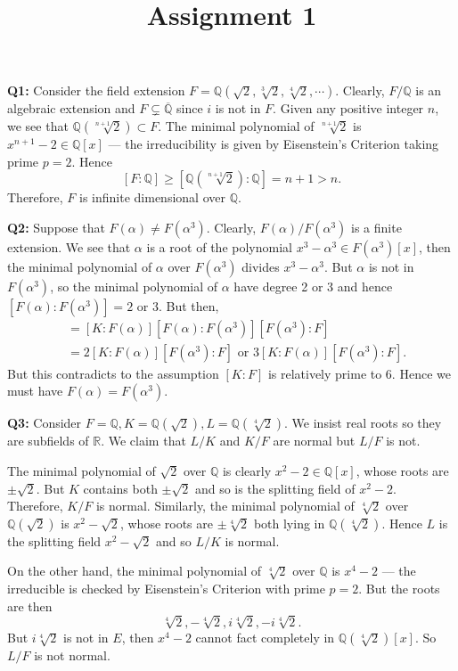 \documentclass[12pt,a4paper]{article}
\title{Assignment 1}
\author{}
\date{}
\def\QQ{\mathbb{Q}}
\def\RR{\mathbb{R}}
\def\aa{\alpha}
\begin{document}
\maketitle

\noindent\textbf{Q1:}
Consider the field extension $F=\QQ(\sqrt{2},\sqrt[3]{2},\sqrt[4]{2},\cdots)$. Clearly, $F/\QQ$ is an algebraic extension and $F\subsetneq \overline{\QQ}$ since $i$ is not in $F$. Given any positive integer $n$, we see that $\QQ(\sqrt[n+1]{2})\subset F$. The minimal polynomial of $\sqrt[n+1]{2}$ is $x^{n+1}-2\in \QQ[x]$ --- the irreducibility is given by Eisenstein's Criterion taking prime $p=2$. Hence $$[F:\QQ] \geq [\QQ(\sqrt[n+1]{2}): \QQ] = n+1 >n.$$
Therefore, $F$ is infinite dimensional over $\QQ$.

\bigskip

\noindent\textbf{Q2:}
Suppose that $F(\aa)\not= F(\aa^3)$. Clearly, $F(\aa)/F(\aa^3)$ is a finite extension. We see that  $\aa$ is a root of the polynomial $x^3-\aa^3\in F(\aa^3)[x]$, then the minimal polynomial of $\aa$ over $F(\aa^3)$ divides $x^3-\aa^3$. But $\aa$ is not in $F(\aa^3)$, so the minimal polynomial of $\aa$ have degree 2 or 3 and hence $[F(\aa):F(\aa^3)]=2$ or 3. But then, 
\begin{align*}
    [K:F]& =[K:F(\aa)][F(\aa):F(\aa^3)][F(\aa^3):F] \\
    & =2[K:F(\aa)][F(\aa^3):F]  \mbox{ or } 3[K:F(\aa)][F(\aa^3):F].
\end{align*}
But this contradicts to the assumption $[K:F]$ is relatively prime to 6. Hence we must have $F(\aa)=F(\aa^3)$.

\bigskip

\noindent\textbf{Q3:} 
Consider $F=\QQ, K=\QQ(\sqrt{2}), L=\QQ(\sqrt[4]{2})$. We insist real roots so they are subfields of $\RR$. We claim that $L/K$ and $K/F$ are normal but $L/F$ is not. 

The minimal polynomial of $\sqrt{2}$ over $\QQ$ is clearly $x^2-2\in \QQ[x]$, whose roots are $\pm \sqrt{2}$. But $K$ contains both $\pm\sqrt{2}$ and so is the splitting field of $x^2-2$. Therefore, $K/F$ is normal. Similarly, the minimal polynomial of $\sqrt[4]{2}$ over $\QQ(\sqrt{2})$ is $x^2-\sqrt{2}$, whose roots are $\pm\sqrt[4]{2}$ both lying in $\QQ(\sqrt[4]{2})$. Hence $L$ is the splitting field $x^2-\sqrt{2}$ and so $L/K$ is normal.

On the other hand, the minimal polynomial of $\sqrt[4]{2}$ over $\QQ$ is $x^4-2$ --- the irreducible is checked by Eisenstein's Criterion with prime $p=2$. But the roots are then $$\sqrt[4]{2},-\sqrt[4]{2},i\sqrt[4]{2},-i\sqrt[4]{2}.$$ But $i\sqrt[4]{2}$ is not in $E$, then $x^4-2$ cannot fact completely in $\QQ(\sqrt[4]{2})[x]$. So $L/F$ is not normal.
\end{document}
